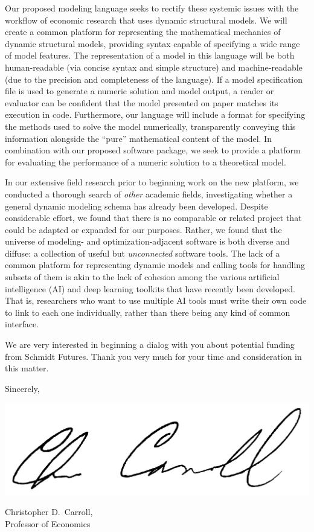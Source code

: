 \documentclass[11pt,pdftex,letterpaper]{article}
\begin{document}
Our proposed modeling language seeks to rectify these systemic issues with the workflow of economic research that uses dynamic structural models. We will create a common platform for representing the mathematical mechanics of dynamic structural models, providing syntax capable of specifying a wide range of model features. The representation of a model in this language will be both human-readable (via concise syntax and simple structure) and machine-readable (due to the precision and completeness of the language). If a model specification file is used to generate a numeric solution and model output, a reader or evaluator can be confident that the model presented on paper matches its execution in code. Furthermore, our language will include a format for specifying the methods used to solve the model numerically, transparently conveying this information alongside the ``pure'' mathematical content of the model. In combination with our proposed software package, we seek to provide a platform for evaluating the performance of a numeric solution to a theoretical model.

In our extensive field research prior to beginning work on the new platform, we conducted a thorough search of \textit{other} academic fields, investigating whether a general dynamic modeling schema has already been developed. Despite considerable effort, we found that there is no comparable or related project that could be adapted or expanded for our purposes. Rather, we found that the universe of modeling- and optimization-adjacent software is both diverse and diffuse: a collection of useful but \textit{unconnected} software tools. The lack of a common platform for representing dynamic models and calling tools for handling subsets of them is akin to the lack of cohesion among the various artificial intelligence (AI) and deep learning toolkits that have recently been developed. That is, researchers who want to use multiple AI tools must write their own code to link to each one individually, rather than there being any kind of common interface.

We are very interested in beginning a dialog with you about potential funding from Schmidt Futures. Thank you very much for your time and consideration in this matter.

\vspace{0.5cm}

{\parskip=2pt Sincerely,

\includegraphics[scale=0.7]{CDCsignature.jpg}

Christopher D.\ Carroll,\\ Professor of Economics}
\end{document}
